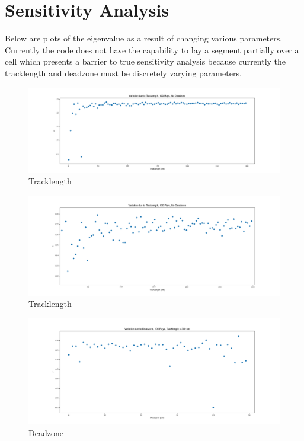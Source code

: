 \documentclass[10pt,letter]{article}
\begin{document}
\section*{Sensitivity Analysis}
Below are plots of the eigenvalue as a result of changing various parameters. Currently the code does not have the capability to lay a segment partially over a cell which presents a barrier to true sensitivity analysis because currently the tracklength and deadzone must be discretely varying parameters. 

\begin{figure}[H]
    \centering
    \includegraphics[width=1.2\textwidth]{figs/sensitivity_length1.png}
    \caption{Tracklength}
    \label{fig:5}
\end{figure}
\begin{figure}[H]
    \centering
    \includegraphics[width=1.2\textwidth]{figs/sensitivity_length2.png}
    \caption{Tracklength}
    \label{fig:5}
\end{figure}
\begin{figure}[H]
    \centering
    \includegraphics[width=1.2\textwidth]{figs/sensitivity_dz.png}
    \caption{Deadzone}
    \label{fig:5}
\end{figure}
\end{document}
